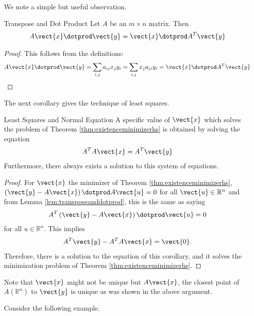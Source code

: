 We note a simple but useful observation.

\begin{lemma}{Transpose and Dot Product}\label{lem:transposeanddotprod}
Let $A$ be an $m\times n$ matrix. Then 
\begin{equation*}
A\vect{x} \dotprod \vect{y} = \vect{x}\dotprod A^T\vect{y} 
\end{equation*}
\end{lemma}

\begin{proof}
This follows from the definitions:
\[ A\vect{x} \dotprod \vect{y}=\sum_{i,j}a_{ij}x_{j} y_{i}
=\sum_{i,j}x_{j} a_{ji} y_{i}= \vect{x} \dotprod A^T\vect{y}
\] \end{proof}

The next corollary gives the technique of least squares.

\begin{corollary}{Least Squares and Normal Equation}\label{cor:normalEquation}
A specific value of $\vect{x}$ which solves the problem of Theorem 
\ref{thm:existenceminimizerhs} is obtained by solving the equation
\begin{equation*}
A^TA\vect{x}=A^T\vect{y}
\end{equation*}
Furthermore, there always exists a solution to this system of equations.
\end{corollary}

\begin{proof} 
For $\vect{x}$ the minimizer of Theorem \ref{thm:existenceminimizerhs}, $\left(
\vect{y}-A\vect{x}\right) \dotprod A \vect{u} =0$ for all $\vect{u} \in \mathbb{R}^{n}$ and from
Lemma \ref{lem:transposeanddotprod}, this is the same as saying
\begin{equation*}
A^T\left( \vect{y}-A\vect{x}\right) \dotprod \vect{u}=0
\end{equation*}
for all $u \in \mathbb{R}^{n}.$ This implies 
\begin{equation*}
A^T\vect{y}-A^TA\vect{x}=\vect{0}.
\end{equation*}
Therefore, there is a solution to the equation of this corollary, and it
solves the minimization problem of Theorem \ref{thm:existenceminimizerhs}.
\end{proof}

Note that $\vect{x}$ might not be unique but $A\vect{x}$, the closest
point of $A\left(\mathbb{R}^{n}\right)$ to $\vect{y}$ is unique as was shown in the
above argument. 

Consider the following example. 

